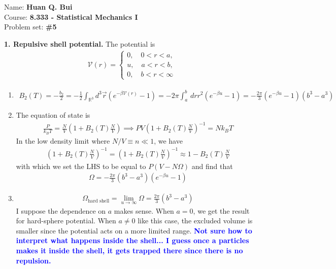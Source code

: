 \documentclass{article}
\theoremstyle{definition}
\newcommand{\be}{\beta}
\newcommand{\f}[2]{\frac{#1}{#2}}
\newcommand{\lp}{\left(}
\newcommand{\rp}{\right)}
\begin{document}
		\begin{framed}
			\noindent Name: \textbf{Huan Q. Bui}\\
			Course: \textbf{8.333 - Statistical Mechanics I}\\
			Problem set: \textbf{\#5}
		\end{framed}
	



\noindent \textbf{1. Repulsive shell potential.} The potential is 
\begin{align*}
\mathcal{V}(r) = \begin{cases}
0, \quad 0 < r < a,\\
u, \quad a < r < b,\\
0, \quad b < r < \infty
\end{cases}
\end{align*}

\begin{enumerate}[label=(\alph*)]
	\item 
	\begin{align*}
	B_2(T) = -\f{b_2}{2} = -\f{1}{2}\int_{\mathbb{R}^3} d^3 \vec{r} \lp e^{-\be \mathcal{V}(r)} - 1 \rp = -2\pi \int_a^b \,dr r^2 \lp e^{-\be u} - 1 \rp = \boxed{-\f{2\pi}{3} \lp e^{-\be u } - 1 \rp (b^3 - a^3)}
	\end{align*}
	\item The equation of state is 
	\begin{align*}
	\f{P}{k_B T} = \f{N}{V}\lp 1 + B_2(T) \f{N}{V} \rp \implies PV \lp 1 + B_2(T)\f{N}{V} \rp^{-1} = N k_B T
	\end{align*}
	In the low density limit where $N/V \equiv n \ll 1$, we have
	\begin{align*}
	\lp 1 + B_2(T) \f{N}{V}  \rp^{-1} = \lp 1 + B_2(T) \f{N}{V}\rp^{-1} \approx 1 - B_2(T) \f{N}{V}
	\end{align*}
	with which we set the LHS to be equal to $P(V-N\Omega)$ and find that 
	\begin{align*}
	\boxed{\Omega = -\f{2\pi}{3} (b^3 - a^3) \lp e^{-\be u} - 1  \rp }
	\end{align*}
	
	
	\item 
	\begin{align*}
	\Omega_\text{hard shell} = \lim_{u\to \infty} \Omega = \boxed{\f{2\pi}{3} (b^3 - a^3) }
	\end{align*}
	I suppose the dependence on $a$ makes sense. When $a=0$, we get the result for hard-sphere potential. When $a\neq 0$ like this case, the excluded volume is smaller since the potential acts on a more limited range. \textbf{\textcolor{blue}{Not sure how to interpret what happens inside the shell... I guess once a particles makes it inside the shell, it gets trapped there since there is no repulsion.}}
\end{enumerate}
\end{document}
